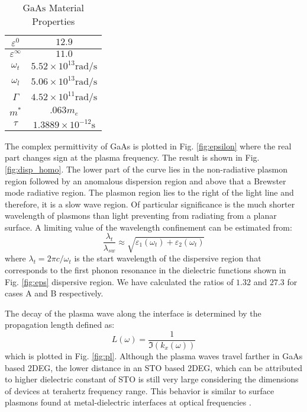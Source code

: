 \documentclass[conference, 10pt]{IEEEtran}
\renewcommand{\O}{\omega}  %
\newcommand{\E}{\varepsilon}  %
\renewcommand{\inf}{\infty}  %
\renewcommand{\^}{\hat}  %
\begin{document}
%
\begin{table}[h]
  \renewcommand{\arraystretch}{1.3}
  \caption{$\mathrm{GaAs}$ Material Properties}
  \label{table_example}
  \centering
  \begin{tabular}{c||c}
    \hline
    $\E^{0}$ & $12.9$\\ \hline
    $\E^{\inf}$ & $11.0$ \\  \hline
    $\O_t$ & $5.52 \times 10^{13} \mathrm{rad/s}$ \\  \hline
    $\O_l$ & $5.06 \times 10^{13} \mathrm{rad/s}$ \\  \hline
    $\Gamma$ &  $4.52 \times 10^{11} \mathrm{rad/s}$ \\  \hline
    $m^{\ast}$ & $.063 m_e$ \\  \hline
    $\tau$ & $1.3889 \times 10^{-12} \mathrm{s} $ \\  \hline
  \end{tabular}
  \label{tab:data}
\end{table}
%
The complex permittivity of GaAs is plotted in Fig. \ref{fig:epsilon} where the real part changes sign at the plasma frequency. The result is shown in Fig. \ref{fig:disp_homo}. The lower part of the curve lies in the non-radiative plasmon region followed by an anomalous dispersion region and above that a Brewster mode radiative region. The plasmon region lies to the right of the light line and therefore, it is a slow wave region. Of particular significance is the much shorter wavelength of plasmons than light preventing from radiating from a planar surface. A limiting value of the wavelength confinement can be estimated from:
%
\begin{equation}
  \frac{\lambda_{t}}{\lambda_{sw}} \approx {\sqrt{\E_1(\O_t) + \E_2(\O_t)}}
  \label{eq:wave_refine}
\end{equation}
%
where $\lambda_t = 2\pi c/{\O_t}$ is the start wavelength of the dispersive region that corresponds to the first phonon resonance in the dielectric functions shown in Fig. \ref{fig:eps} dispersive region. We have calculated the ratios of $1.32$ and $27.3$ for cases A and B respectively.

The decay of the plasma wave along the interface is determined by the propagation length defined as:
%
\begin{equation}
  L(\O) = \frac{1}{\Im (k_x(\O))}
  \label{eq:plength}
\end{equation}
%
which is plotted in Fig. \ref{fig:pl}. Although the plasma waves travel farther in GaAs based 2DEG, the lower distance in an STO based 2DEG, which can be attributed to higher dielectric constant of STO is still very large considering the dimensions of devices at terahertz frequency range. This behavior is similar to surface plasmons found at metal-dielectric interfaces at optical frequencies \cite{nevels2014behavior}.
%
\end{document}
